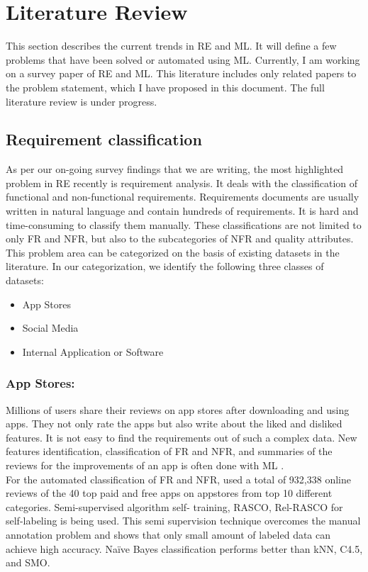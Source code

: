 \section{Literature Review}
This section describes the current trends in RE and ML. It will define a few problems that have
been solved or automated using ML. Currently, I am working on a survey paper of RE and ML.
This literature includes only related papers to the problem statement, which I have proposed in this
document. The full literature review is under progress.
\subsection{Requirement classification}
As per our on-going survey findings that we are writing, the most highlighted problem in RE
recently is requirement analysis. It deals with the classification of functional and non-functional
requirements. Requirements documents are usually written in natural language and
contain hundreds of requirements. It is hard and time-consuming to classify them manually.
These classifications are not limited to only FR and NFR, but also to the subcategories of NFR
and quality attributes. This problem area can be categorized on the basis of existing datasets in
the literature. In our categorization, we identify the following three classes of datasets:
\begin{itemize}
\item{App Stores}
\item{Social Media}
\item{Internal Application or Software}
\end{itemize}
\subsubsection{App Stores: }
Millions of users share their reviews on app stores after downloading and using apps. They not only rate the apps but also write about the liked and disliked features. It is not easy to
find the requirements out of such a complex data. New features identification, classification of
FR and NFR, and summaries of the reviews for the improvements of an app is often done with ML
\cite{deocadez2017} \cite{lu2017automatic} \cite{maalej2015bug} \cite{jiang2014}. \\

	For the automated classification of FR and NFR, \cite{deocadez2017}  used a total of 932,338 online
reviews of the 40 top paid and free apps on appstores from top 10 different categories. Semi-supervised algorithm self- training, RASCO, Rel-RASCO for self-labeling is being used. This
semi supervision technique overcomes the manual annotation problem and shows that only
small amount of labeled data can achieve high accuracy. Naïve Bayes classification performs better than kNN, C4.5, and SMO.\\


